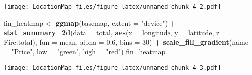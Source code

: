 \documentclass[]{article}
\newenvironment{Shaded}{\begin{snugshade}}{\end{snugshade}}
\newcommand{\KeywordTok}[1]{\textcolor[rgb]{0.13,0.29,0.53}{\textbf{#1}}}
\newcommand{\DataTypeTok}[1]{\textcolor[rgb]{0.13,0.29,0.53}{#1}}
\newcommand{\DecValTok}[1]{\textcolor[rgb]{0.00,0.00,0.81}{#1}}
\newcommand{\FloatTok}[1]{\textcolor[rgb]{0.00,0.00,0.81}{#1}}
\newcommand{\StringTok}[1]{\textcolor[rgb]{0.31,0.60,0.02}{#1}}
\newcommand{\OperatorTok}[1]{\textcolor[rgb]{0.81,0.36,0.00}{\textbf{#1}}}
\newcommand{\NormalTok}[1]{#1}
\begin{document}
\texttt{[image: LocationMap\_files/figure-latex/unnamed-chunk-4-2.pdf]}

\begin{Shaded}
\begin{Highlighting}[]
\NormalTok{fin_heatmap <-}\StringTok{ }\KeywordTok{ggmap}\NormalTok{(basemap, }\DataTypeTok{extent =} \StringTok{"device"}\NormalTok{) }\OperatorTok{+}\StringTok{ }\KeywordTok{stat_summary_2d}\NormalTok{(}\DataTypeTok{data =}\NormalTok{ total, }\KeywordTok{aes}\NormalTok{(}\DataTypeTok{x =}\NormalTok{ longitude, }\DataTypeTok{y =}\NormalTok{ latitude, }\DataTypeTok{z =}\NormalTok{ Fire.total), }\DataTypeTok{fun =}\NormalTok{ mean, }\DataTypeTok{alpha =} \FloatTok{0.6}\NormalTok{, }\DataTypeTok{bins =} \DecValTok{30}\NormalTok{) }\OperatorTok{+}\StringTok{ }\KeywordTok{scale_fill_gradient}\NormalTok{(}\DataTypeTok{name =} \StringTok{"Price"}\NormalTok{, }\DataTypeTok{low =} \StringTok{"green"}\NormalTok{, }\DataTypeTok{high =} \StringTok{"red"}\NormalTok{)}
\NormalTok{fin_heatmap}
\end{Highlighting}
\end{Shaded}

\texttt{[image: LocationMap\_files/figure-latex/unnamed-chunk-4-3.pdf]}
\end{document}
